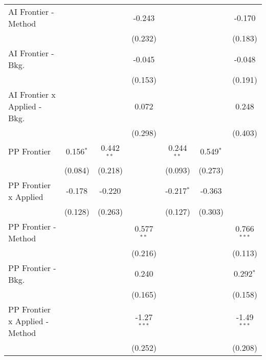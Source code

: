 \begin{tabular}{lcccccc}
   AI Frontier - Method           &             &              & -0.243        &              &              & -0.170\\   
                                  &             &              & (0.232)       &              &              & (0.183)\\   
   AI Frontier - Bkg.             &             &              & -0.045        &              &              & -0.048\\   
                                  &             &              & (0.153)       &              &              & (0.191)\\   
   AI Frontier x Applied - Bkg.   &             &              & 0.072         &              &              & 0.248\\   
                                  &             &              & (0.298)       &              &              & (0.403)\\   
   PP Frontier                    & 0.156$^{*}$ & 0.442$^{**}$ &               & 0.244$^{**}$ & 0.549$^{*}$  &   \\   
                                  & (0.084)     & (0.218)      &               & (0.093)      & (0.273)      &   \\   
   PP Frontier x Applied          & -0.178      & -0.220       &               & -0.217$^{*}$ & -0.363       &   \\   
                                  & (0.128)     & (0.263)      &               & (0.127)      & (0.303)      &   \\   
   PP Frontier - Method           &             &              & 0.577$^{**}$  &              &              & 0.766$^{***}$\\   
                                  &             &              & (0.216)       &              &              & (0.113)\\   
   PP Frontier - Bkg.             &             &              & 0.240         &              &              & 0.292$^{*}$\\   
                                  &             &              & (0.165)       &              &              & (0.158)\\   
   PP Frontier x Applied - Method &             &              & -1.27$^{***}$ &              &              & -1.49$^{***}$\\   
                                  &             &              & (0.252)       &              &              & (0.208)\\   

\end{tabular}
